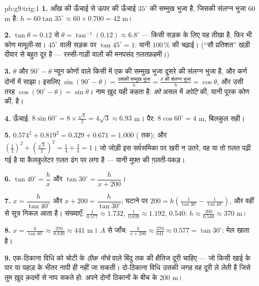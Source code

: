 \begin{solution}{pb:g9:trig:1}
\textbf{1.} आँख की ऊँचाई से ऊपर की ऊँचाई $35^\circ$ की सम्मुख भुजा
है, जिसकी संलग्न भुजा $60$ m है:
$h = 60 \tan 35^\circ \approx 60 \times 0.700 = 42$ m।

\textbf{2.} $\tan\theta = 0.12$ से
$\theta = \tan^{-1}(0.12) \approx 6.8^\circ$ --- किसी सड़क के लिए
यह तीखा है, फिर भी कोण मामूली-सा। $45^\circ$ वाली सड़क पर
$\tan 45^\circ = 1$: यानी $100\,\%$ की चढ़ाई। (``सौ प्रतिशत'' खड़ी
दीवार से बहुत दूर है --- रस्सी-गाड़ी वालों की मनपसंद ग़लतफ़हमी।)

\textbf{3.} $\theta$ और $90^\circ - \theta$ न्यून कोणों वाले किसी
 में एक की सम्मुख भुजा दूसरे की संलग्न भुजा है, और
कर्ण दोनों में साझा। इसलिए
$\sin(90^\circ - \theta) = \frac{\text{उसकी सम्मुख भुजा}}{h} =
\frac{\theta \text{ की संलग्न भुजा}}{h} = \cos\theta$, और उसी तरह
$\cos(90^\circ - \theta) = \sin\theta$। नाम ख़ुद यही कहता है:
\emph{को} असल में \emph{कोटि} की, यानी पूरक कोण की,  है।

\textbf{4.} ऊँचाई: $8 \sin 60^\circ = 8 \times
\frac{\sqrt3}{2} = 4\sqrt3 \approx 6.93$ m। पैर:
$8 \cos 60^\circ = 4$ m, बिलकुल सही।

\textbf{5.} $0.574^2 + 0.819^2 = 0.329 + 0.671 = 1.000$ ( तक);
और $\left(\frac12\right)^2 +
\left(\frac{\sqrt3}{2}\right)^2 = \frac14 + \frac34 = 1$। जो जोड़ी
इस सर्वसमिका पर खरी न उतरे, वह या तो ग़लत पढ़ी गई है या कैलकुलेटर
ग़लत ढंग पर लगा है --- यानी मुफ़्त की ग़लती-पकड़।

\textbf{6.} $\tan 40^\circ = \dfrac hx$ और
$\tan 30^\circ = \dfrac{h}{x + 200}$।

\textbf{7.} $x = \dfrac{h}{\tan 40^\circ}$ और
$x + 200 = \dfrac{h}{\tan 30^\circ}$; घटाने पर
$200 = h\left(\frac{1}{\tan 30^\circ} -
\frac{1}{\tan 40^\circ}\right)$, और वहीं से सूत्र निकल आता है।
संख्याएँ: $\frac{1}{0.577} \approx 1.732$, $\frac{1}{0.839} \approx
1.192$,  $0.540$:
$h \approx \frac{200}{0.540} \approx 370$ m।

\textbf{8.} $x = \frac{h}{\tan 40^\circ} \approx
\frac{370}{0.839} \approx 441$ m। $A$ से जाँच:
$\frac{h}{x + 200} \approx \frac{370}{641} \approx 0.577 =
\tan 30^\circ$: मेल खाता है।

\textbf{9.} एक-ठिकाना विधि को चोटी के \emph{ठीक नीचे} वाले बिंदु
तक की क्षैतिज दूरी चाहिए --- जो किसी खाई के पार या पहाड़ के भीतर
नापी ही नहीं जा सकती। दो-ठिकाना विधि उसकी जगह वह दूरी ले लेती है
जिसे तुम ख़ुद क़दमों से नाप सकते हो: अपने दोनों ठिकानों के बीच के
$200$ m।


\end{solution}
